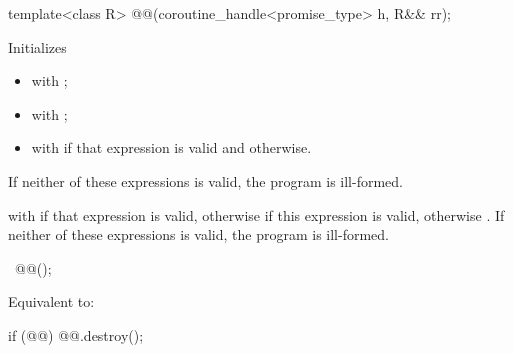 %
\begin{itemdecl}
template<class R>
  @@(coroutine_handle<promise_type> h, R&& rr);
\end{itemdecl}
\begin{itemdescr}
\pnum
\effects
Initializes
\begin{itemize}
\item {} with ;
\item {} with ;
\item {}
with  if that expression
is valid and  otherwise.
\end{itemize}
If neither of these expressions is valid, the program is ill-formed.
\item {} with  if that expression is
valid, otherwise 
if this expression is valid, otherwise .
If neither of these expressions is valid, the program is ill-formed.
\end{itemdescr}

%
\begin{itemdecl}
~@@();
\end{itemdecl}
\begin{itemdescr}
\pnum
\effects
Equivalent to:
\begin{codeblock}
if (@@)
  @@.destroy();
\end{codeblock}
\end{itemdescr}

